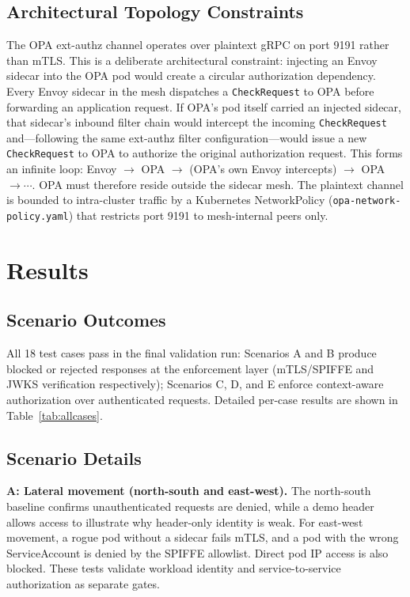 \documentclass[conference]{IEEEtran}
\begin{document}
\subsection{Architectural Topology Constraints}
\label{sec:topo}
The OPA ext-authz channel operates over plaintext gRPC on port 9191 rather than mTLS.
This is a deliberate architectural constraint: injecting an Envoy sidecar into the OPA pod
would create a circular authorization dependency. Every Envoy sidecar in the mesh dispatches
a \texttt{CheckRequest} to OPA before forwarding an application request. If OPA's pod itself
carried an injected sidecar, that sidecar's inbound filter chain would intercept the incoming
\texttt{CheckRequest} and---following the same ext-authz filter configuration---would issue a
new \texttt{CheckRequest} to OPA to authorize the original authorization request. This forms
an infinite loop: Envoy $\to$ OPA $\to$ (OPA's own Envoy intercepts) $\to$ OPA $\to \cdots$.
OPA must therefore reside outside the sidecar mesh. The plaintext channel is bounded to
intra-cluster traffic by a Kubernetes NetworkPolicy (\texttt{opa-network-policy.yaml}) that
restricts port 9191 to mesh-internal peers only.

\vspace{4pt}
\section{Results}
\subsection{Scenario Outcomes}
All 18 test cases pass in the final validation run: Scenarios A and B produce blocked or
rejected responses at the enforcement layer (mTLS/SPIFFE and JWKS verification respectively);
Scenarios C, D, and E enforce context-aware authorization over authenticated requests.
Detailed per-case results are shown in Table~\ref{tab:allcases}.

\subsection{Scenario Details}
\textbf{A: Lateral movement (north-south and east-west).} The north-south baseline
confirms unauthenticated requests are denied, while a demo header allows access to
illustrate why header-only identity is weak. For east-west movement, a rogue pod
without a sidecar fails mTLS, and a pod with the wrong ServiceAccount is denied by the
SPIFFE allowlist. Direct pod IP access is also blocked. These tests validate workload
identity and service-to-service authorization as separate gates.
\end{document}
